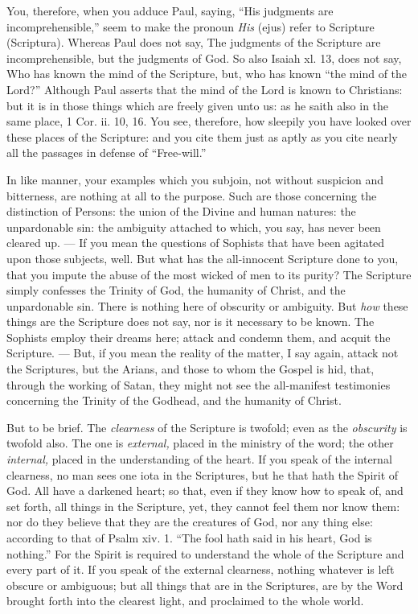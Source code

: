 You, therefore, when you adduce Paul, saying, “His judgments are incomprehensible,” seem to make the pronoun \emph{His }(ejus) refer to Scripture (Scriptura). Whereas Paul does not say, The judgments of the Scripture are incomprehensible, but the judgments of God. So also Isaiah xl. 13, does not say, Who has known the mind of the Scripture, but, who has known “the mind of the Lord?” Although Paul asserts that the mind of the Lord is known to Christians: but it is in those things which are freely given unto us: as he saith also in the same place, 1 Cor. ii. 10, 16. You see, therefore, how sleepily you have looked over these places of the Scripture: and you cite them just as aptly as you cite nearly all the passages in defense of “Free-will.”

In like manner, your examples which you subjoin, not without suspicion and bitterness, are nothing at all to the purpose. Such are those concerning the distinction of Persons: the union of the Divine and human natures: the unpardonable sin: the ambiguity attached to which, you say, has never been cleared up. — If you mean the questions of Sophists that have been agitated upon those subjects, well. But what has the all-innocent Scripture done to you, that you impute the abuse of the most wicked of men to its purity? The Scripture simply confesses the Trinity of God, the humanity of Christ, and the unpardonable sin. There is nothing here of obscurity or ambiguity. But \emph{how }these things are the Scripture does not say, nor is it necessary to be known. The Sophists employ their dreams here; attack and condemn them, and acquit the Scripture. — But, if you mean the reality of the matter, I say again, attack not the Scriptures, but the Arians, and those to whom the Gospel is hid, that, through the working of Satan, they might not see the all-manifest testimonies concerning the Trinity of the Godhead, and the humanity of Christ.

But to be brief. The \emph{clearness }of the Scripture is twofold; even as the \emph{obscurity }is twofold also. The one is \emph{ external, }placed in the ministry of the word; the other \emph{internal, }placed in the understanding of the heart. If you speak of the internal clearness, no man sees one iota in the Scriptures, but he that hath the Spirit of God. All have a darkened heart; so that, even if they know how to speak of, and set forth, all things in the Scripture, yet, they cannot feel them nor know them: nor do they believe that they are the creatures of God, nor any thing else: according to that of Psalm xiv. 1. “The fool hath said in his heart, God is nothing.” For the Spirit is required to understand the whole of the Scripture and every part of it. If you speak of the external clearness, nothing whatever is left obscure or ambiguous; but all things that are in the Scriptures, are by the Word brought forth into the clearest light, and proclaimed to the whole world.

